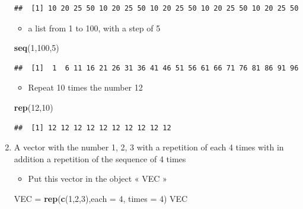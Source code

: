 \documentclass[]{article}
\newenvironment{Shaded}{\begin{snugshade}}{\end{snugshade}}
\newcommand{\KeywordTok}[1]{\textcolor[rgb]{0.13,0.29,0.53}{\textbf{#1}}}
\newcommand{\DataTypeTok}[1]{\textcolor[rgb]{0.13,0.29,0.53}{#1}}
\newcommand{\DecValTok}[1]{\textcolor[rgb]{0.00,0.00,0.81}{#1}}
\newcommand{\StringTok}[1]{\textcolor[rgb]{0.31,0.60,0.02}{#1}}
\newcommand{\NormalTok}[1]{#1}
\providecommand{\tightlist}{%
  \setlength{\itemsep}{0pt}\setlength{\parskip}{0pt}}
\begin{document}
\begin{enumerate}
\begin{verbatim}
##  [1] 10 20 25 50 10 20 25 50 10 20 25 50 10 20 25 50 10 20 25 50
\end{verbatim}

  \begin{itemize}
  \tightlist
  \item
    a list from 1 to 100, with a step of 5
  \end{itemize}

\begin{Shaded}
\begin{Highlighting}[]
\KeywordTok{seq}\NormalTok{(}\DecValTok{1}\NormalTok{,}\DecValTok{100}\NormalTok{,}\DecValTok{5}\NormalTok{)}
\end{Highlighting}
\end{Shaded}

\begin{verbatim}
##  [1]  1  6 11 16 21 26 31 36 41 46 51 56 61 66 71 76 81 86 91 96
\end{verbatim}

  \begin{itemize}
  \tightlist
  \item
    Repeat 10 times the number 12
  \end{itemize}

\begin{Shaded}
\begin{Highlighting}[]
\KeywordTok{rep}\NormalTok{(}\DecValTok{12}\NormalTok{,}\DecValTok{10}\NormalTok{)}
\end{Highlighting}
\end{Shaded}

\begin{verbatim}
##  [1] 12 12 12 12 12 12 12 12 12 12
\end{verbatim}
\item
  A vector with the number 1, 2, 3 with a repetition of each 4 times
  with in addition a repetition of the sequence of 4 times

  \begin{itemize}
  \tightlist
  \item
    Put this vector in the object « VEC »
  \end{itemize}

\begin{Shaded}
\begin{Highlighting}[]
\NormalTok{VEC =}\StringTok{ }\KeywordTok{rep}\NormalTok{(}\KeywordTok{c}\NormalTok{(}\DecValTok{1}\NormalTok{,}\DecValTok{2}\NormalTok{,}\DecValTok{3}\NormalTok{),}\DataTypeTok{each =} \DecValTok{4}\NormalTok{, }\DataTypeTok{times =} \DecValTok{4}\NormalTok{)}
\NormalTok{VEC}
\end{Highlighting}
\end{Shaded}


\end{enumerate}
\end{document}

